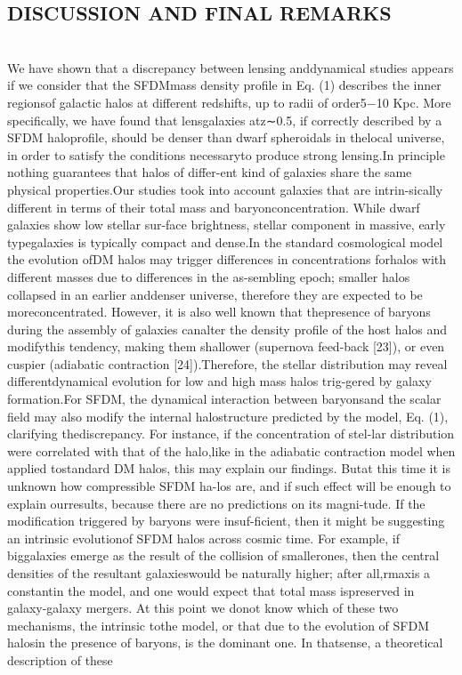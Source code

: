 \documentclass[10pt]{article}
\begin{document}
\begin{multicols}{2}

\section{\large \centering DISCUSSION AND FINAL REMARKS}\\

We have shown that a discrepancy between lensing anddynamical studies appears if we consider that the SFDMmass density profile in Eq. (1) describes the inner regionsof galactic halos at different redshifts, up to radii of order5−10 Kpc.   More  specifically,  we  have  found  that  lensgalaxies atz∼0.5, if correctly described by a SFDM haloprofile,  should  be  denser  than  dwarf  spheroidals  in  thelocal universe, in order to satisfy the conditions necessaryto produce strong lensing.In  principle  nothing  guarantees  that  halos  of  differ-ent kind of galaxies share the same physical properties.Our  studies  took  into  account  galaxies  that  are  intrin-sically different in terms of their total mass and baryonconcentration.  While dwarf galaxies show low stellar sur-face brightness, stellar component in massive, early typegalaxies is typically compact and dense.In  the  standard  cosmological  model  the  evolution  ofDM  halos  may  trigger  differences  in  concentrations  forhalos with different masses due to differences in the as-sembling epoch; smaller halos collapsed in an earlier anddenser universe, therefore they are expected to be moreconcentrated.   However,  it  is  also  well  known  that  thepresence of baryons during the assembly of galaxies canalter  the  density  profile  of  the  host  halos  and  modifythis  tendency,  making  them  shallower  (supernova  feed-back  [23]),  or  even  cuspier  (adiabatic  contraction  [24]).Therefore,  the  stellar  distribution  may  reveal  differentdynamical  evolution  for  low  and  high  mass  halos  trig-gered by galaxy formation.For SFDM, the dynamical interaction between baryonsand  the  scalar  field  may  also  modify the  internal  halostructure predicted by the model, Eq. (1), clarifying thediscrepancy.   For  instance,  if  the  concentration  of  stel-lar  distribution  were  correlated  with  that  of  the  halo,like in the adiabatic contraction model when applied tostandard DM halos, this may explain our findings.  Butat this time it is unknown how compressible SFDM ha-los are, and if such effect will be enough to explain ourresults,  because  there  are  no  predictions  on  its  magni-tude. If the modification triggered by baryons were insuf-ficient, then it might be suggesting an intrinsic evolutionof SFDM halos across cosmic time.  For example, if biggalaxies  emerge  as  the  result  of  the  collision  of  smallerones, then the central densities of the resultant galaxieswould be naturally higher;  after all,rmaxis a constantin  the  model,  and  one  would  expect  that  total  mass  ispreserved in galaxy-galaxy mergers.  At this point we donot know which of these two mechanisms, the intrinsic tothe model, or that due to the evolution of SFDM halosin the presence of baryons, is the dominant one.  In thatsense, a theoretical description of these 
\end{multicols}
\end{document}
